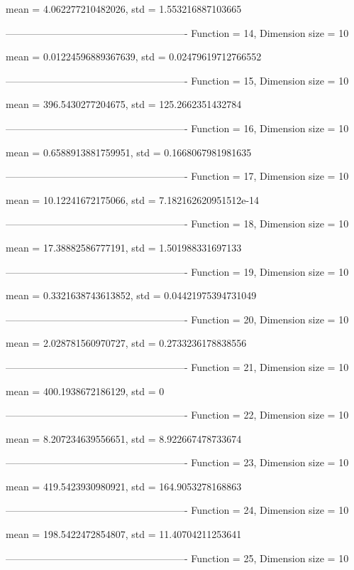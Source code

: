 mean = 4.062277210482026, std = 1.553216887103665

-------------------------------------------------------
Function = 14, Dimension size = 10


mean = 0.01224596889367639, std = 0.02479619712766552

-------------------------------------------------------
Function = 15, Dimension size = 10


mean = 396.5430277204675, std = 125.2662351432784

-------------------------------------------------------
Function = 16, Dimension size = 10


mean = 0.6588913881759951, std = 0.1668067981981635

-------------------------------------------------------
Function = 17, Dimension size = 10


mean = 10.12241672175066, std = 7.182162620951512e-14

-------------------------------------------------------
Function = 18, Dimension size = 10


mean = 17.38882586777191, std = 1.501988331697133

-------------------------------------------------------
Function = 19, Dimension size = 10


mean = 0.3321638743613852, std = 0.04421975394731049

-------------------------------------------------------
Function = 20, Dimension size = 10


mean = 2.028781560970727, std = 0.2733236178838556

-------------------------------------------------------
Function = 21, Dimension size = 10


mean = 400.1938672186129, std = 0

-------------------------------------------------------
Function = 22, Dimension size = 10


mean = 8.207234639556651, std = 8.922667478733674

-------------------------------------------------------
Function = 23, Dimension size = 10


mean = 419.5423930980921, std = 164.9053278168863

-------------------------------------------------------
Function = 24, Dimension size = 10


mean = 198.5422472854807, std = 11.40704211253641

-------------------------------------------------------
Function = 25, Dimension size = 10


